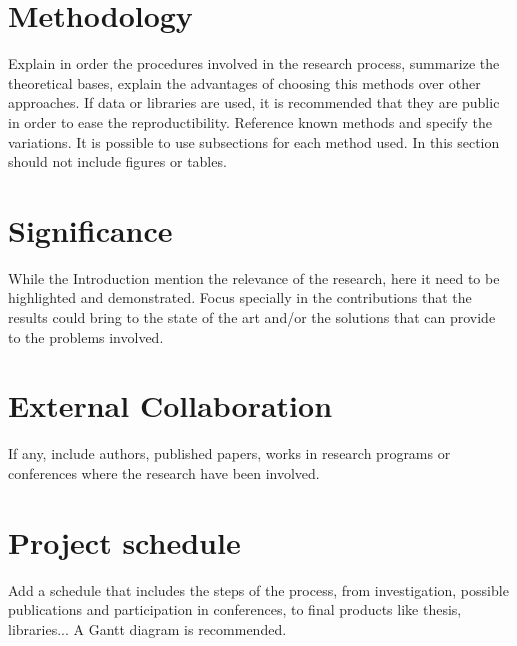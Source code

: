 \documentclass[
  11pt,
  a4paper,
  oneside
]{article}
\begin{document}
\section{Methodology}
Explain in order the procedures involved in the research process, summarize the theoretical bases, explain the advantages of choosing this methods over other approaches. If data or libraries are used, it is recommended that they are public in order to ease the reproductibility. Reference known methods and specify the variations. It is possible to use subsections for each method used. In this section should not include figures or tables.

\section{Significance}
While the Introduction mention the relevance of the research, here it need to be highlighted and demonstrated. Focus specially in the contributions that the results could bring to the state of the art and/or the solutions that can provide to the problems involved.

\section{External Collaboration}

If any, include authors, published papers, works in research programs or conferences where the research have been involved.

\section{Project schedule}
Add a schedule that includes the steps of the process, from investigation, possible publications and participation in conferences, to final products like thesis, libraries... A Gantt diagram is recommended.

\nocite{usc, uw, yu, ub, mu, proposal, yale}


\end{document}
